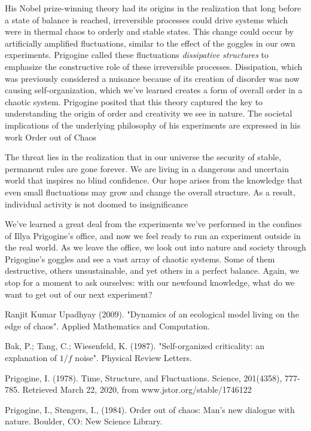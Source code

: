 \documentclass{article}
\begin{document}
His Nobel prize-winning theory had its origins in the realization that long before a state of balance is reached, irreversible processes could drive systems which were in thermal chaos to orderly and stable states\cite{ds}. This change could occur by artificially amplified fluctuations, similar to the effect of the goggles in our own experiments. Prigogine called these fluctuations \emph{dissipative structures} to emphasize the constructive role of these irreversible processes. Dissipation, which was previously considered a nuisance because of its creation of disorder was now causing self-organization, which we've learned creates a form of overall order in a chaotic system. Prigogine posited that this theory captured the key to understanding the origin of order and creativity we see in nature. The societal implications of the underlying philosophy of his experiments are expressed in his work Order out of Chaos\cite{oooc}
\begin{displayquote}
The threat lies in the realization that in our universe the security of stable, permanent rules are gone forever. We are living in a dangerous and uncertain world that inspires no blind confidence. Our hope arises from the knowledge that even small fluctuations may grow and change the overall structure. As a result, individual activity is not doomed to insignificance
\end{displayquote}

We've learned a great deal from the experiments we've performed in the confines of Illya Prigogine's office, and now we feel ready to run an experiment outside in the real world. As we leave the office, we look out into nature and society through Prigogine's goggles and see a vast array of chaotic systems. Some of them destructive, others unsustainable, and yet others in a perfect balance. Again, we stop for a moment to ask ourselves: with our newfound knowledge, what do we want to get out of our next experiment?


\begin{thebibliography}{4}

Ranjit Kumar Upadhyay (2009). "Dynamics of an ecological model living on the edge of chaos". Applied Mathematics and Computation.

Bak, P.; Tang, C.; Wiesenfeld, K. (1987). "Self-organized criticality: an explanation of $1/f$ noise". Physical Review Letters.

Prigogine, I. (1978). Time, Structure, and Fluctuations. Science, 201(4358), 777-785. Retrieved March 22, 2020, from www.jstor.org/stable/1746122

Prigogine, I., Stengers, I., (1984). Order out of chaos: Man's new dialogue with nature. Boulder, CO: New Science Library.

\end{thebibliography}
\end{document}
